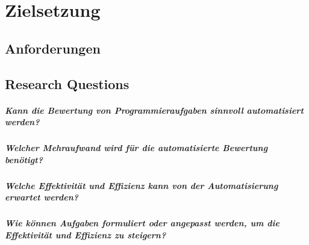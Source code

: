 \chapter{Zielsetzung}\label{ch:goals}

\section{Anforderungen}\label{sec:requirements}

\section{Research Questions}\label{sec:research-questions}

\paragraph{Kann die Bewertung von Programmieraufgaben sinnvoll automatisiert werden?}\label{par:rq-can-automate}

\paragraph{Welcher Mehraufwand wird für die automatisierte Bewertung benötigt?}\label{par:rq-additional-effort}


\paragraph{Welche Effektivität und Effizienz kann von der Automatisierung erwartet werden?}\label{par:rq-effectivity-efficiency}


\paragraph{Wie können Aufgaben formuliert oder angepasst werden, um die Effektivität und Effizienz zu steigern?}\label{par:rq-improve-effectivity-efficiency}
